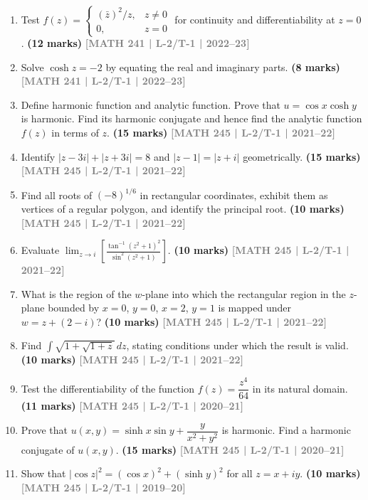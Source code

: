 \documentclass[12pt,a4paper]{article}
\newcommand{\yr}[1]{\hfill\textcolor{gray}{\small\textbf{[#1]}}}
\newcommand{\mk}[1]{\textcolor{orange!70!black}{\small\textbf{(#1 marks)}}}
\begin{document}
\begin{enumerate}
\item Test $f(z)=\begin{cases}(\bar{z})^{2}/z, & z\neq 0\\ 0, & z=0\end{cases}$ for continuity and differentiability at $z=0$.
\mk{12} \yr{MATH 241 | L-2/T-1 | 2022--23}

\item Solve $\cosh z=-2$ by equating the real and imaginary parts.
\mk{8} \yr{MATH 241 | L-2/T-1 | 2022--23}

\item Define harmonic function and analytic function. Prove that $u=\cos x\cosh y$ is harmonic. Find its harmonic conjugate and hence find the analytic function $f(z)$ in terms of $z$.
\mk{15} \yr{MATH 245 | L-2/T-1 | 2021--22}

\item Identify $|z-3i|+|z+3i|=8$ and $|z-1|=|z+i|$ geometrically.
\mk{15} \yr{MATH 245 | L-2/T-1 | 2021--22}

\item Find all roots of $(-8)^{1/6}$ in rectangular coordinates, exhibit them as vertices of a regular polygon, and identify the principal root.
\mk{10} \yr{MATH 245 | L-2/T-1 | 2021--22}

\item Evaluate $\displaystyle\lim_{z\to i}\left[\frac{\tan^{-1}(z^{2}+1)^{2}}{\sin^{2}(z^{2}+1)}\right]$.
\mk{10} \yr{MATH 245 | L-2/T-1 | 2021--22}

\item What is the region of the $w$-plane into which the rectangular region in the $z$-plane bounded by $x=0$, $y=0$, $x=2$, $y=1$ is mapped under $w=z+(2-i)$?
\mk{10} \yr{MATH 245 | L-2/T-1 | 2021--22}

\item Find $\displaystyle\int\sqrt{1+\sqrt{1+z}}\,dz$, stating conditions under which the result is valid.
\mk{10} \yr{MATH 245 | L-2/T-1 | 2021--22}

\item Test the differentiability of the function $f(z)=\dfrac{z^{4}}{64}$ in its natural domain.
\mk{11} \yr{MATH 245 | L-2/T-1 | 2020--21}

\item Prove that $u(x,y)=\sinh x\sin y+\dfrac{y}{x^{2}+y^{2}}$ is harmonic. Find a harmonic conjugate of $u(x,y)$.
\mk{15} \yr{MATH 245 | L-2/T-1 | 2020--21}

\item Show that $|\cos z|^{2}=(\cos x)^{2}+(\sinh y)^{2}$ for all $z=x+iy$.
\mk{10} \yr{MATH 245 | L-2/T-1 | 2019--20}


\end{enumerate}
\end{document}
